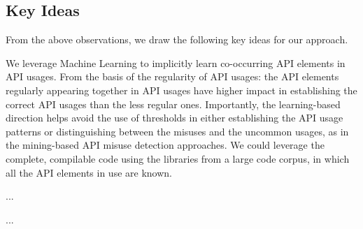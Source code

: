 \subsection{Key Ideas}
\label{sec:key-ideas}

From the above observations, we draw the following key ideas for our
approach.

\begin{key-idea}
We leverage Machine Learning to implicitly learn co-occurring API
elements in API usages. From the basis of the regularity of API
usages: the API elements regularly appearing together in API usages
have higher impact in establishing the correct API usages than the
less regular ones. Importantly, the learning-based direction helps
avoid the use of thresholds in either establishing the API usage
patterns or distinguishing between the misuses and the uncommon
usages, as in the mining-based API misuse detection approaches. We
could leverage the complete, compilable code using the libraries from
a large code corpus, in which all the API elements in use are known.
\end{key-idea}


\begin{key-idea}
...
\end{key-idea}

\begin{key-idea}
...
\end{key-idea}


